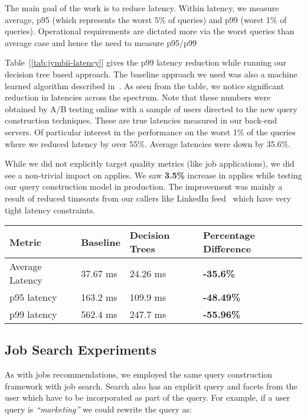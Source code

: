 The main goal of the work is to reduce latency. Within latency, we
measure average, p95 (which represents the worst 5\% of queries) and p99 (worst
1\% of queries). Operational requirements are dictated more via the worst
queries than average case and hence the need to measure p95/p99

Table~[\ref{tab:jymbii-latency}] gives the p99 latency reduction while running
our decision tree based approach. The baseline approach we used was also a
machine learned algorithm described in~\cite{borisyuk2016casmos}.
As seen from the table, we notice significant reduction in latencies across the
spectrum. Note that these numbers were obtained by A/B testing online with a
sample of users directed to the new query construction techniques. These are
true latencies measured in our back-end servers. Of particular interest in the
performance on the worst 1\% of the queries where we reduced latency by over
55\%. Average latencies were down by 35.6\%.

While we did not explicitly target quality metrics (like job applications), we
did see a non-trivial impact on applies. We saw {\bf 3.5\%} increase in applies
while testing our query construction model in production. The improvement was
mainly a result of reduced timeouts from our callers like 
LinkedIn feed~\cite{agarwal2015personalizing} which have very tight latency
constraints.

\begin{table*}
\centering
\caption{Impact of Query Construction on Jobs Recommendations Latency}
\begin{tabular}{|l|l|l|l|} \hline
Metric&Baseline&Decision Trees&Percentage Difference \\ \hline
Average Latency& 37.67 ms&24.26  ms& \bf{-35.6\%} \\ \hline
p95 latency& 163.2 ms& 109.9 ms& \bf{-48.49\%} \\ \hline
p99 latency& 562.4 ms&247.7  ms& \bf{-55.96\%} \\ \hline
\end{tabular}
\label{tab:jymbii-latency}
\end{table*}

\subsection{Job Search Experiments}

As with jobs recommendations, we employed the same query construction framework
with job search. Search also has an explicit query and facets from the user
which have to be incorporated as part of the query. For example, if a user
query is {\it ``marketing''} we could rewrite the query as:

